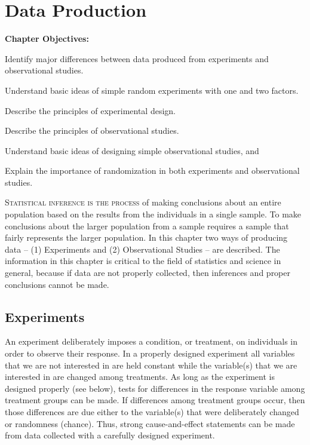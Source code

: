 \documentclass[10pt,openany]{book}\usepackage[]{graphicx}\usepackage[]{color}
\begin{document}
\chapter{Data Production} \label{chap:DataProd}
\begin{ChapObj}{\boxwidth}
  \textbf{Chapter Objectives:}
  \begin{Enumerate}
    \item Identify major differences between data produced from experiments and observational studies.
    \item Understand basic ideas of simple random experiments with one and two factors.
    \item Describe the principles of experimental design.
    \item Describe the principles of observational studies.
    \item Understand basic ideas of designing simple observational studies, and
    \item Explain the importance of randomization in both experiments and observational studies.
  \end{Enumerate}
\end{ChapObj}

\minitoc
\newpage

\lettrine{S}{tatistical inference is the process} of making conclusions about an entire population based on the results from the individuals in a single sample.  To make conclusions about the larger population from a sample requires a sample that fairly represents the larger population.  In this chapter two ways of producing data -- (1) Experiments and (2) Observational Studies -- are described.  The information in this chapter is critical to the field of statistics and science in general, because if data are not properly collected, then inferences and proper conclusions cannot be made.




\section{Experiments}
An experiment deliberately imposes a condition, or treatment, on individuals in order to observe their response.  In a properly designed experiment all variables that we are not interested in are held constant while the variable(s) that we are interested in are changed among treatments.  As long as the experiment is designed properly (see below), tests for differences in the response variable among treatment groups can be made.  If differences among treatment groups occur, then those differences are due either to the variable(s) that were deliberately changed or randomness (chance).  Thus, strong cause-and-effect statements can be made from data collected with a carefully designed experiment.
\end{document}
